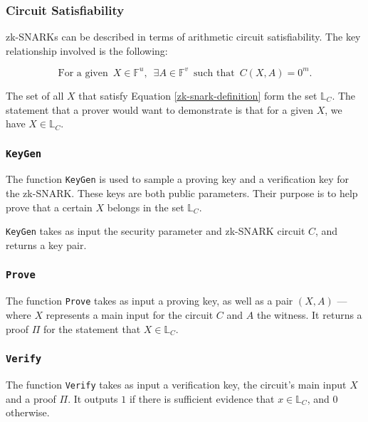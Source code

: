 \documentclass{article}
\begin{document}
\subsubsection{Circuit Satisfiability}
zk-SNARKs can be described in terms of arithmetic circuit satisfiability. The key relationship involved is the following:

\begin{equation}
\text{For a given} \,\,\, X \in \mathbb{F}^u, \,\,\, \exists A \in \mathbb{F}^v \,\,\, \text{such that} \,\,\, C(X, A) = 0^{m}.
\label{zk-snark-definition}
\end{equation}
\newline

The set of all $X$ that satisfy Equation \ref{zk-snark-definition} form the set $\mathbb{L}_C$. The statement that a prover would want to demonstrate is that for a given $X$, we have $X \in \mathbb{L}_C$.

\subsubsection{\texttt{KeyGen}}
The function \texttt{KeyGen} is used to sample a proving key and a verification key for the zk-SNARK. These keys are both public parameters. Their purpose is to help prove that a certain $X$ belongs in the set $\mathbb{L}_C$.

\texttt{KeyGen} takes as input the security parameter and zk-SNARK circuit $C$, and returns a key pair.

\subsubsection{\texttt{Prove}}
The function \texttt{Prove} takes as input a proving key, as well as a pair $(X, A)$ --- where $X$ represents a main input for the circuit $C$ and $A$ the witness. It returns a proof $\Pi$ for the statement that $X \in \mathbb{L}_C$.

\subsubsection{\texttt{Verify}}
The function \texttt{Verify} takes as input a verification key, the circuit's main input $X$ and a proof $\Pi$. It outputs $1$ if there is sufficient evidence that $x \in \mathbb{L}_C$, and 0 otherwise.
\end{document}
